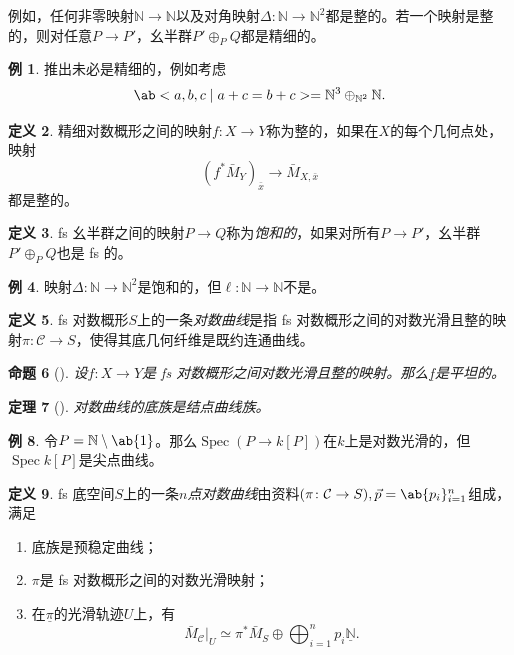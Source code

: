 \documentclass{amsart}
\newtheorem{thm}{定理}[section]
\newtheorem{prop}[thm]{命题}
\theoremstyle{definition}
\newtheorem{defn}[thm]{定义}
\newtheorem{exm}[thm]{例}
\theoremstyle{remark}
\theoremstyle{plain}
\theoremstyle{definition}
\theoremstyle{remark}
\newcommand{\N}{\mathbb{N}}
\newcommand{\mc}[1]{\mathcal{#1}}
\newcommand{\ul}[1]{\underline{#1}}
\newcommand{\1}{\mathbf{1}}
\newcommand{\2}{\mathbf{2}}
\newcommand{\3}{\mathbf{3}}
\DeclareMathOperator{\Spec}{Spec}
\begin{document}
例如，任何非零映射\(\N \to \N\)以及对角映射\(\Delta \colon\N \to \N^2\)都是整的。若一个映射是整的，则对任意\(P \to P'\)，幺半群\(P' \oplus_P Q\)都是精细的。

\begin{exm}
    推出未必是精细的，例如考虑
    \[ \ab< a ,b,c \mid a+c=b+c> = \N^3 \oplus_{\N^2} \N. \]
\end{exm}

\begin{defn}
    精细对数概形之间的映射\(f \colon X \to Y\)称为整的，如果在\(X\)的每个几何点处，映射
    \[ (f^*\bar{M}_Y)_{\bar{x}} \to \bar{M}_{X,\bar{x}} \]
    都是整的。
\end{defn}

\begin{defn}
    fs 幺半群之间的映射\(P \to Q\)称为\textit{饱和的}，如果对所有\(P \to P'\)，幺半群\(P' \oplus_P Q\)也是 fs 的。
\end{defn}

\begin{exm}
    映射\(\Delta \colon \N \to \N^2\)是饱和的，但\(\ell \colon \N \to \N\)不是。
\end{exm}

\begin{defn}
    fs 对数概形\(S\)上的一条\textit{对数曲线}是指 fs 对数概形之间的对数光滑且整的映射\(\pi \colon \mc{C} \to S\)，使得其底几何纤维是既约连通曲线。
\end{defn}

\begin{prop}[{\cite{Kato1989}}]
    设\(f \colon X \to Y\)是 fs 对数概形之间对数光滑且整的映射。那么\(\ul{f}\)是平坦的。
\end{prop}

\begin{thm}[{\cite{FKato2000}}]
    对数曲线的底族是结点曲线族。
\end{thm}

\begin{exm}
    令\(P = \N \setminus \ab\{1\}\)。那么\(\Spec (P \to k[P])\)在\(k\)上是对数光滑的，但\(\Spec k[P]\)是尖点曲线。
\end{exm}

\begin{defn}
    fs 底空间\(S\)上的一条\textit{\(n\)点对数曲线}由资料\((\pi \colon \mc{C} \to S), \vec{p} = \ab\{p_i\}_{i=1}^n\)组成，满足
    \begin{enumerate}
        \item 底族是预稳定曲线；
        \item \(\pi\)是 fs 对数概形之间的对数光滑映射；
        \item 在\(\ul{\pi}\)的光滑轨迹\(U\)上，有
            \[ \bar{M}_{\mc{C}}|_U \simeq \pi^* \bar{M}_S \oplus \bigoplus_{i=1}^n p_i \ul{\N}. \]
    \end{enumerate}
\end{defn}
\end{document}

